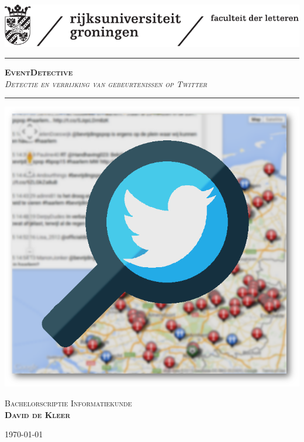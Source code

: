 
\begin{titlepage}
\begin{center}
\setcounter{page}{0}


\vspace*{-2cm}
\includegraphics[scale=1]{logo.pdf}

\vspace{2 cm}

\hrule
\vspace{1 cm}
\Huge{\textbf{\textsc{EventDetective}}}\\
\vspace{0.5 cm}
\Large{\textit{\textsc{Detectie en verrijking van gebeurtenissen op Twitter}}}

\vspace{1 cm}
\hrule
\vspace{1.5 cm}

\includegraphics[scale=0.45]{mapchartlogo.png}
\vfill


\LARGE{\textsc{Bachelorscriptie Informatiekunde}}\\
\vspace{1.3 cm}
\Large{\textsc{\textbf{David de Kleer}}}
\vspace{0.5 cm}

\vrule
\hspace{0.2 cm}
\normalsize{\textsc{\today}}
\hspace{0.2 cm}
\vrule
\end{center}
\end{titlepage}
